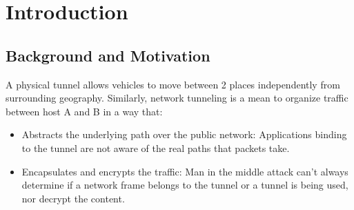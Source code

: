 \cleardoublepage\chapter{Introduction}
\minitoc\label{sec:introduction}\vspace{.5cm}

\section{Background and Motivation}
A physical tunnel allows vehicles to move between 2 places independently from surrounding geography. 
Similarly, network tunneling is a mean to organize traffic between host A and B in a way that:

\begin{itemize}
    \item Abstracts the underlying path over the public network: Applications binding to the tunnel are not aware of the real paths that packets take.
    \item Encapsulates and encrypts the traffic: Man in the middle attack can't always determine if a network frame belongs to the tunnel or a tunnel is being used, nor decrypt the content.
\end{itemize}

